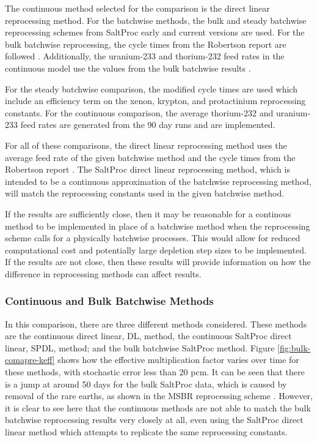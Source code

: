 The continuous method selected for the comparison is the direct linear reprocessing method. For the batchwise methods, the bulk and steady batchwise reprocessing schemes from SaltProc early and current versions are used. For the bulk batchwise reprocessing, the cycle times from the Robertson report are followed \cite{robertson_conceptual_1971}. Additionally, the uranium-233 and thorium-232 feed rates in the continuous model use the values from the bulk batchwise results \cite{rykhlevskii_advanced_2018}.

For the steady batchwise comparison, the modified cycle times are used which include an efficiency term on the xenon, krypton, and protactinium reprocessing constants. For the continuous comparison, the average thorium-232 and uranium-233 feed rates are generated from the 90 day runs and are implemented.

For all of these comparisons, the direct linear reprocessing method uses the average feed rate of the given batchwise method and the cycle times from the Robertson report \cite{robertson_conceptual_1971}. The SaltProc direct linear reprocessing method, which is intended to be a continuous approximation of the batchwise reprocessing method, will match the reprocessing constants used in the given batchwise method.

If the results are sufficiently close, then it may be reasonable for a continous method to be implemented in place of a batchwise method when the reprocessing scheme calls for a physically batchwise processes. This would allow for reduced computational cost and potentially large depletion step sizes to be implemented. If the results are not close, then these results will provide information on how the difference in reprocessing methods can affect results.


\subsubsection{Continuous and Bulk Batchwise Methods}
\label{s:bulk}

In this comparison, there are three different methods considered. These methods are the continuous direct linear, DL, method, the continuous SaltProc direct linear, SPDL, method; and the bulk batchwise SaltProc method. Figure \ref{fig:bulk-comapre-keff} shows how the effective multiplication factor varies over time for these methods, with stochastic error less than 20 pcm.
It can be seen that there is a jump at around 50 days for the bulk SaltProc data, which is caused by removal of the rare earths, as shown in the MSBR reprocessing scheme \cite{robertson_conceptual_1971}. However, it is clear to see here that the continuous methods are not able to match the bulk batchwise reprocessing results very closely at all, even using the SaltProc direct linear method which attempts to replicate the same reprocessing constants.

